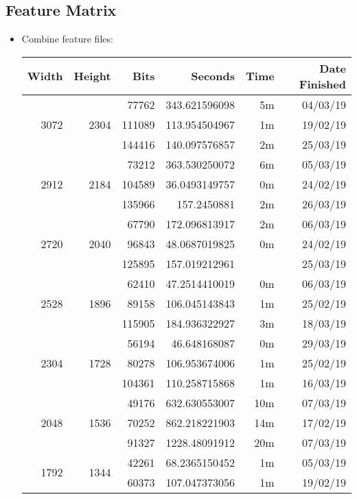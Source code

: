 \subsection{Feature Matrix}
\begin{itemize}
  \item Combine feature files:
  \begin{center}
  \begin{tabular}{ r r r | r r r }
  Width & Height & Bits & Seconds & Time & Date Finished \\ \hline
  \multirow{3}{*}{3072} & \multirow{3}{*}{2304} & 77762 & 343.621596098 & 5m & 04/03/19 \\
  & & 111089 & 113.954504967 & 1m & 19/02/19 \\
  & & 144416 & 140.097576857 & 2m & 25/03/19 \\
  \hline
  \multirow{3}{*}{2912} & \multirow{3}{*}{2184} & 73212 & 363.530250072 & 6m & 05/03/19 \\
  & & 104589 & 36.0493149757 & 0m & 24/02/19 \\
  & & 135966 & 157.2450881 & 2m & 26/03/19 \\
  \hline
  \multirow{3}{*}{2720} & \multirow{3}{*}{2040} & 67790 & 172.096813917 & 2m & 06/03/19 \\
  & & 96843 & 48.0687019825 & 0m & 24/02/19 \\
  & & 125895 & 157.019212961 &  & 25/03/19 \\
  \hline
  \multirow{3}{*}{2528} & \multirow{3}{*}{1896} & 62410 & 47.2514410019 & 0m & 06/03/19 \\
  & & 89158 & 106.045143843 & 1m & 25/02/19 \\
  & & 115905 & 184.936322927 & 3m & 18/03/19 \\
  \hline
  \multirow{3}{*}{2304} & \multirow{3}{*}{1728} & 56194 & 46.648168087 & 0m & 29/03/19 \\
  & & 80278 & 106.953674006 & 1m & 25/02/19 \\
  & & 104361 & 110.258715868 & 1m & 16/03/19 \\
  \hline
  \multirow{3}{*}{2048} & \multirow{3}{*}{1536} & 49176 & 632.630553007 & 10m & 07/03/19 \\
  & & 70252 & 862.218221903 & 14m & 17/02/19 \\
  & & 91327 & 1228.48091912 & 20m & 07/03/19 \\
  \hline
  \multirow{3}{*}{1792} & \multirow{3}{*}{1344} & 42261 & 68.2365150452 & 1m & 05/03/19 \\
  & & 60373 & 107.047373056 & 1m & 19/02/19 \\

\end{tabular}
\end{center}
\end{itemize}
